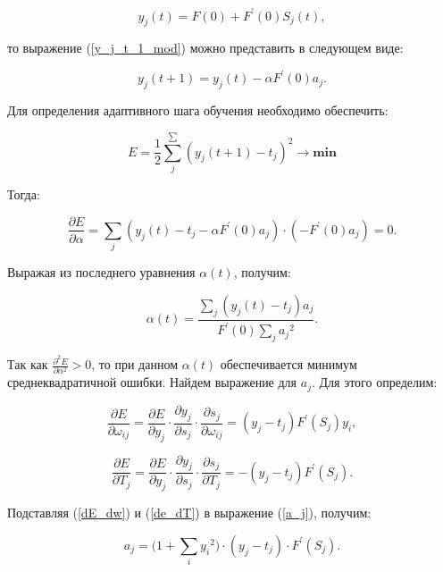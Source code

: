 \begin{equation}
    y_j(t) = F(0) + F^\prime(0)S_j(t),
\end{equation}

то выражение (\ref{y_j_t_1_mod}) можно представить в следующем виде:

\begin{equation}
    y_j(t + 1) = y_j(t) - \alpha F^\prime(0) a_j.
\end{equation}

Для определения адаптивного шага обучения необходимо обеспечить:

\begin{equation}
    E = \frac{1}{2}\sum_{j}^{\sum}{(y_j(t + 1) - t_j)^2\rightarrow\mathbf{min}}
\end{equation}

Тогда:

\begin{equation}
    \frac{\partial E}{\partial\alpha} = \sum_{j}{(y_j(t) - t_j - \alpha F^\prime(0)a_j)\cdot(-F^\prime(0) a_j) = 0}.
\end{equation}

Выражая из последнего уравнения $\alpha(t)$, получим:

\begin{equation}\label{alpha_t}
    \alpha(t) = \frac{\sum_{j}{(y_j(t) - t_j) a_j}}{F^\prime(0)\sum_{j}{a_j}^2}.
\end{equation}

Так как $\frac{\partial^2E}{\partial\alpha^2} > 0$, то при данном $\alpha(t)$ обеспечивается минимум среднеквадратичной ошибки. Найдем выражение для $a_j$. Для этого определим:

\begin{equation}\label{dE_dw}
    \frac{\partial E}{\partial\omega_{ij}} = \frac{\partial E}{\partial y_j}\cdot\frac{\partial y_j}{\partial s_j}\cdot\frac{\partial s_j}{\partial\omega_{i j}}=(y_j - t_j)F^\prime(S_j) y_i,
\end{equation}

\begin{equation}\label{de_dT}
    \frac{\partial E}{\partial T_j} = \frac{\partial E}{\partial y_j}\cdot\frac{\partial y_j}{\partial s_j}\cdot\frac{\partial s_j}{\partial T_j} = -(y_j - t_j)F^\prime(S_j).
\end{equation}

Подставляя (\ref{dE_dw}) и (\ref{de_dT}) в выражение (\ref{a_j}), получим:

\begin{equation}\label{a_j_mod}
    a_j = (1 + \sum_{i}{{y_i}^2)\cdot(y_j - t_j)}\cdot F^\prime(S_j).
\end{equation}

